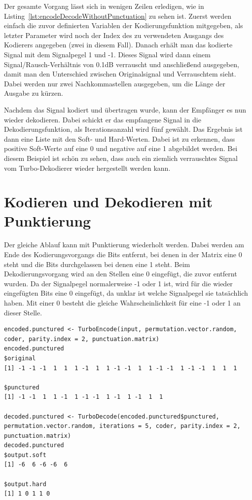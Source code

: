 Der gesamte Vorgang lässt sich in wenigen Zeilen erledigen, wie in Listing~\ref{lst:encodeDecodeWithoutPunctuation} zu sehen ist. Zuerst werden einfach die zuvor definierten Variablen der Kodierungsfunktion mitgegeben, als letzter Parameter wird noch der Index des zu verwendeten Ausgangs des Kodierers angegeben (zwei in diesem Fall). Danach erhält man das kodierte Signal mit dem Signalpegel 1 und -1. Dieses Signal wird dann einem Signal/Rausch-Verhältnis von 0.1dB  verrauscht und anschließend ausgegeben, damit man den Unterschied zwischen Originalsignal und Verrauschtem sieht. Dabei werden nur zwei Nachkommastellen ausgegeben, um die Länge der Ausgabe zu kürzen. 

Nachdem das Signal kodiert und übertragen wurde, kann der Empfänger es nun wieder dekodieren. Dabei schickt er das empfangene Signal in die Dekodierungsfunktion, als Iterationsanzahl wird fünf gewählt. Das Ergebnis ist dann eine Liste mit den Soft- und Hard-Werten. Dabei ist zu erkennen, dass positive Soft-Werte auf eine 0 und negative auf eine 1 abgebildet werden. Bei diesem Beispiel ist schön zu sehen, dass auch ein ziemlich verrauschtes Signal vom Turbo-Dekodierer wieder hergestellt werden kann.

\FloatBarrier
\section{Kodieren und Dekodieren mit Punktierung}
\label{sec:example_withPunctuation}

Der gleiche Ablauf kann mit Punktierung wiederholt werden. Dabei werden am Ende des Kodierungsvorgangs die Bits entfernt, bei denen in der Matrix eine 0 steht und die Bits durchgelassen bei denen eine 1 steht. Beim Dekodierungsvorgang wird an den Stellen eine 0 eingefügt, die zuvor entfernt wurden. Da der Signalpegel normalerweise -1 oder 1 ist, wird für die wieder eingefügten Bits eine 0 eingefügt, da unklar ist welche Signalpegel sie tatsächlich haben. Mit einer 0 besteht die gleiche Wahrscheinlichkeit für eine -1 oder 1 an dieser Stelle.

\begin{lstlisting}[caption=Kodierung und Dekodierung mit Punktierung, label={lst:encodeDecodeWithPunctuation}, float=!th]
encoded.punctured <- TurboEncode(input, permutation.vector.random, coder, parity.index = 2, punctuation.matrix)
encoded.punctured
$original
[1] -1 -1 -1  1  1  1 -1  1  1 -1 -1  1  1 -1 -1  1 -1 -1  1  1  1

$punctured
[1] -1 -1  1  1 -1  1 -1 -1  1 -1  1 -1  1  1

decoded.punctured <- TurboDecode(encoded.punctured$punctured, permutation.vector.random, iterations = 5, coder, parity.index = 2, punctuation.matrix)
decoded.punctured
$output.soft
[1] -6  6 -6 -6  6

$output.hard
[1] 1 0 1 1 0
\end{lstlisting}

